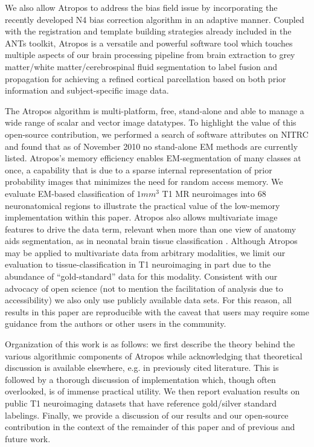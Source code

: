 \documentclass[11pt,english]{article}
\begin{document}
We also allow Atropos to address the bias field issue by incorporating
the recently developed N4 bias correction algorithm
\citep{Tustison2010} in an adaptive manner.  Coupled with the
registration \citep{Avants2010b} and template building strategies
\citep{Avants2010} already included in the ANTs toolkit, Atropos is a
versatile and powerful software tool which touches multiple aspects of
our brain processing pipeline from brain extraction
\citep{Avants2010a} to grey matter/white matter/cerebrospinal fluid
segmentation to label fusion and propagation for achieving a refined
cortical parcellation based on both prior information and
subject-specific image data.

The Atropos algorithm is multi-platform, free, stand-alone and able to
manage a wide range of scalar and vector image datatypes.  To highlight the
value of this open-source contribution, we performed a search of
software attributes on NITRC and found that as of November 2010 no
stand-alone EM methods are currently listed.
Atropos's memory efficiency enables EM-segmentation of many classes at
once, a capability that is due to a sparse internal representation of
prior probability images that minimizes the need for random access
memory.  We evaluate EM-based classification of $1 mm^3$ T1 MR
neuroimages into 68 neuronatomical regions to illustrate the practical
value of the low-memory implementation within this paper.  Atropos
also allows multivariate image features to drive the data term, relevant when more than one view of anatomy aids
segmentation, as in neonatal brain tissue classification
\cite{Weisenfeld2009}.  Although Atropos may be applied to
multivariate data from arbitrary modalities, we limit our evaluation
to tissue-classification in T1 neuroimaging in part due to the
abundance of ``gold-standard'' data for this modality.  Consistent
with our advocacy of open science (not to mention the facilitation of
analysis due to accessibility) we also only use publicly available
data sets.  For this reason, all results in this paper are
reproducible with the caveat that users may require some guidance from
the authors or other users in the community.

Organization of this work is as follows: we first describe the theory
behind the various algorithmic components of Atropos while
acknowledging that theoretical discussion is available elsewhere,
e.g. in previously cited literature.  This is followed by a thorough
discussion of implementation which, though often overlooked, is of
immense practical utility.  We then report evaluation results on
public T1 neuroimaging datasets that have reference gold/silver
standard labelings.  Finally, we provide a discussion of our results
and our open-source contribution in the context of the remainder of
this paper and of previous and future work.
\end{document}
